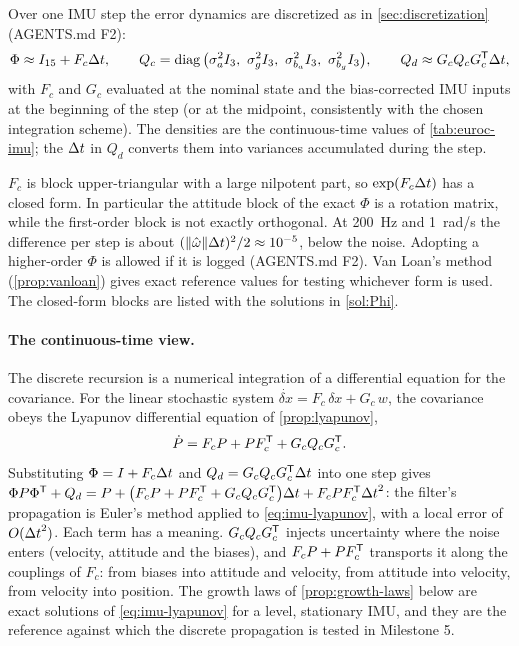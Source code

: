 Over one IMU step the error dynamics are discretized as in \cref{sec:discretization} (AGENTS.md F2):
\begin{equation}
  \Phi \approx I_{15} + F_c\Dt, \qquad
  Q_c = \diag\big(\sigma_a^2 I_3,\ \sigma_g^2 I_3,\ \sigma_{b_a}^2 I_3,\ \sigma_{b_g}^2 I_3\big), \qquad
  Q_d \approx G_c Q_c G_c\T\Dt ,
  \label{eq:imu-discretization}
\end{equation}
with $F_c$ and $G_c$ evaluated at the nominal state and the bias-corrected IMU inputs at the beginning of the
step (or at the midpoint, consistently with the chosen integration scheme). The densities are the
continuous-time values of \cref{tab:euroc-imu}; the ${\Delta t}$ in $Q_d$ converts them into variances
accumulated during the step.

\begin{remark}
$F_c$ is block upper-triangular with a large nilpotent part, so $\exp(F_c{\Delta t})$ has a closed form. In particular the
attitude block of the exact $\Phi$ is a rotation matrix, while the first-order block is not exactly orthogonal. At
200~Hz and 1~rad/s the difference per step is about $(\|\hat\omega\|{\Delta t})^2/2 \approx 10^{-5}$, below the noise.
Adopting a higher-order $\Phi$ is allowed if it is logged (AGENTS.md F2). Van Loan's method
(\cref{prop:vanloan}) gives exact reference values for testing whichever form is used.
\ifsolutions The closed-form blocks are listed with the solutions in \cref{sol:Phi}.\fi
\end{remark}

\paragraph{The continuous-time view.} The discrete recursion is a numerical integration of a differential equation for the covariance.
For the linear stochastic system $\dot{\delta x} = F_c\,\delta x + G_c\,w$, the covariance obeys the Lyapunov differential equation of
\cref{prop:lyapunov},
\begin{equation}
  \dot P = F_cP + PF_c^{\mathsf{T}} + G_cQ_cG_c^{\mathsf{T}} .
  \label{eq:imu-lyapunov}
\end{equation}
Substituting $\Phi = I + F_c{\Delta t}$ and $Q_d = G_cQ_cG_c^{\mathsf{T}}{\Delta t}$ into one step gives
$\Phi P\Phi^{\mathsf{T}} + Q_d = P + \big(F_cP + PF_c^{\mathsf{T}} + G_cQ_cG_c^{\mathsf{T}}\big){\Delta t} + F_cPF_c^{\mathsf{T}}{\Delta t}^2$: the filter's propagation is Euler's method applied to
\eqref{eq:imu-lyapunov}, with a local error of $O({\Delta t}^2)$. Each term has a meaning. $G_cQ_cG_c^{\mathsf{T}}$ injects uncertainty where the noise enters (velocity,
attitude and the biases), and $F_cP + PF_c^{\mathsf{T}}$ transports it along the couplings of $F_c$: from biases into attitude and velocity, from attitude into
velocity, from velocity into position. The growth laws of \cref{prop:growth-laws} below are exact solutions of \eqref{eq:imu-lyapunov} for a level,
stationary IMU, and they are the reference against which the discrete propagation is tested in Milestone 5.

